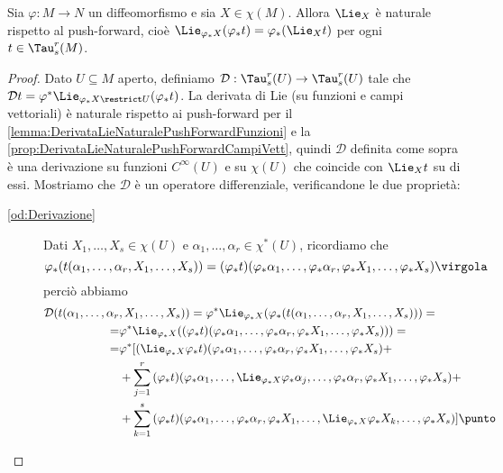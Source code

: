 \begin{proposition}
	Sia $\varphi: M \to N$ un diffeomorfismo e sia $X\in\chi(M)$. Allora $\Lie_X$ è naturale rispetto al push-forward, cioè $\Lie_{\varphi_*X} (\varphi_*t) = \varphi_*(\Lie_Xt)$ per ogni $t\in\Tau_s^r(M)$.
\end{proposition}
\begin{proof}
	Dato $U\subseteq M$ aperto, definiamo $\mathcal D: \Tau_s^r(U) \to \Tau_s^r(U)$ tale che $\mathcal Dt = \varphi^*\Lie_{\varphi_*X\restrict U}(\varphi_*t)$.
	La derivata di Lie (su funzioni e campi vettoriali) è naturale rispetto ai push-forward per il \cref{lemma:DerivataLieNaturalePushForwardFunzioni} e la \cref{prop:DerivataLieNaturalePushForwardCampiVett}, quindi $\mathcal D$ definita come sopra è una derivazione su funzioni $C^\infty(U)$ e su $\chi(U)$ che coincide con $\Lie_Xt$ su di essi.
	Mostriamo che $\mathcal D$ è un operatore differenziale, verificandone le due proprietà:
	\begin{description}
	 \item [\ref{od:Derivazione}]
	Dati $X_1,\ldots,X_s\in\chi(U)$ e $\alpha_1,\ldots,\alpha_r\in\chi^*(U)$, ricordiamo che
	\begin{equation*}
	\varphi_*(t(\alpha_1,\ldots,\alpha_r,X_1,\ldots,X_s) )= (\varphi_*t)(\varphi_*\alpha_1,\ldots,\varphi_*\alpha_r,\varphi_*X_1,\ldots,\varphi_*X_s)\virgola
	\end{equation*}
	perciò abbiamo
	\begin{align*}
		\mathcal D(t(\alpha_1,\ldots,\alpha_r&,X_1,\ldots,X_s)) = \varphi^*\Lie_{\varphi_*X}(\varphi_*(t(\alpha_1,\ldots,\alpha_r,X_1,\ldots,X_s))) =\\
		=& \varphi^*\Lie_{\varphi_*X}((\varphi_*t)(\varphi_*\alpha_1,\ldots,\varphi_*\alpha_r,\varphi_*X_1,\ldots,\varphi_*X_s))) = \\
		=& \varphi^*[(\Lie_{\varphi_*X}\varphi_*t)(\varphi_*\alpha_1,\ldots,\varphi_*\alpha_r,\varphi_*X_1,\ldots,\varphi_*X_s) +\\
		&+\sum_{j=1}^r{(\varphi_*t)(\varphi_*\alpha_1,\ldots,\Lie_{\varphi_*X}\varphi_*\alpha_j,\ldots,\varphi_*\alpha_r,\varphi_*X_1,\ldots,\varphi_*X_s)} +\\
		&+\sum_{k=1}^s{(\varphi_*t)(\varphi_*\alpha_1,\ldots,\varphi_*\alpha_r,\varphi_*X_1,\ldots,\Lie_{\varphi_*X}\varphi_*X_k,\ldots,\varphi_*X_s)}] \punto
	\end{align*}	

\end{description}
\end{proof}
